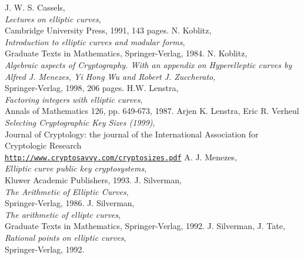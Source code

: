 \newpage
\begin{thebibliography}{99999}

     J. W. S. Cassels,
	 \\
        {\em Lectures on elliptic curves},\\
	Cambridge University Press, 1991, 143 pages.
    N. Koblitz, 
	 \\
        {\em Introduction to elliptic curves and modular forms},\\
	Graduate Texts in Mathematics, Springer-Verlag, 1984.
    N. Koblitz,  
	\\
	{\em Algebraic aspects of Cryptography. With an appendix on 
	Hyperelleptic curves by Alfred J. Menezes, Yi Hong Wu and Robert 
	J. Zuccherato}, \\
	Springer-Verlag, 1998, 206 pages.
     H.W. Lenstra, 
         \\
        {\em Factoring integers with elliptic curves}, \\
	Annals of Mathematics 126, pp. 649-673, 1987.
     Arjen K. Lenstra, Eric R. Verheul
         \\
        {\em Selecting Cryptographic Key Sizes (1999)},\\
	Journal of Cryptology: the journal of the International 
	Association for Cryptologic Research \\
	\href{http://www.cryptosavvy.com/cryptosizes.pdf}
	{\texttt{http://www.cryptosavvy.com/cryptosizes.pdf}}
    A. J. Menezes, 
	 \\
        {\em Elliptic curve public key cryptosystems},\\
	Kluwer Academic Publishers, 1993.
     J. Silverman, 
        \\
        {\em The Arithmetic of Elliptic Curves},\\
	Springer-Verlag, 1986.
    J. Silverman,
	 \\
        {\em The arithmetic of elliptc curves},\\
	Graduate Texts in Mathematics, Springer-Verlag, 1992.
    J. Silverman, J. Tate,
	 \\
        {\em Rational points on elliptic curves},\\
	Springer-Verlag, 1992.

\end{thebibliography}



